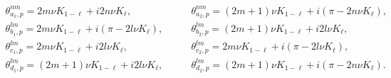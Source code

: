\begin{equation}
\begin{array}{ll}
\theta _{a_{1},p}^{nm}=2m\nu K_{1-\ell }+i2n\nu K_{\ell }, & \theta
_{a_{2},p}^{nm}=(2m+1)\nu K_{1-\ell }+i(\pi -2n\nu K_{\ell }), \\ 
\theta _{b_{1},p}^{lm}=2m\nu K_{1-\ell }+i(\pi -2l\nu K_{\ell }),\qquad  & 
\theta _{b_{2},p}^{lm}=(2m+1)\nu K_{1-\ell }+i2l\nu K_{\ell }, \\ 
\theta _{c_{1},p}^{lm}=2m\nu K_{1-\ell }+i2l\nu K_{\ell }, & \theta
_{c_{2},p}^{lm}=2m\nu K_{1-\ell }+i(\pi -2l\nu K_{\ell }), \\ 
\theta _{d_{1},p}^{lm}=(2m+1)\nu K_{1-\ell }+i2l\nu K_{\ell }, & \theta
_{d_{2},p}^{lm}=(2m+1)\nu K_{1-\ell }+i(\pi -2n\nu K_{\ell }).%
\end{array}
\label{poles}
\end{equation}%
